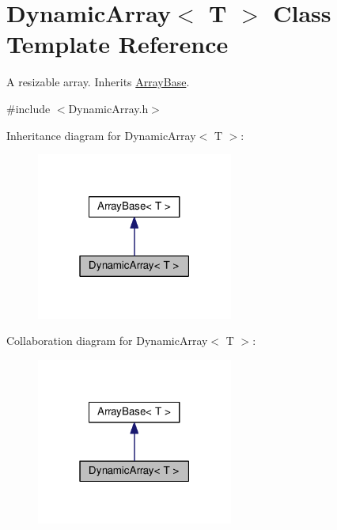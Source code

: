 \hypertarget{a00002}{\section{Dynamic\+Array$<$ T $>$ Class Template Reference}
\label{a00002}
}


A resizable array. Inherits \hyperlink{a00001}{Array\+Base}.  




{\ttfamily \#include $<$Dynamic\+Array.\+h$>$}



Inheritance diagram for Dynamic\+Array$<$ T $>$\+:
\nopagebreak
\begin{figure}[H]
\begin{center}
\leavevmode
\includegraphics[width=183pt]{d1/d2b/a00018}
\end{center}
\end{figure}


Collaboration diagram for Dynamic\+Array$<$ T $>$\+:
\nopagebreak
\begin{figure}[H]
\begin{center}
\leavevmode
\includegraphics[width=183pt]{dd/da2/a00019}
\end{center}
\end{figure}
